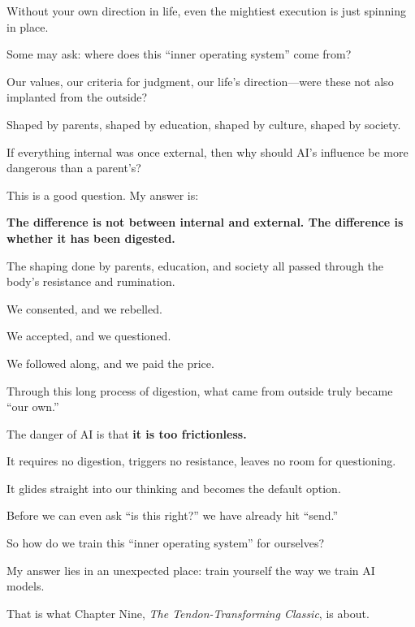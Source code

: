 Without your own direction in life, even the mightiest execution is just spinning in place.

\vspace{1em}

Some may ask: where does this ``inner operating system'' come from?

Our values, our criteria for judgment, our life's direction---were these not also implanted from the outside?

Shaped by parents, shaped by education, shaped by culture, shaped by society.

If everything internal was once external, then why should AI's influence be more dangerous than a parent's?

\vspace{1em}

This is a good question. My answer is:

\textbf{The difference is not between internal and external. The difference is whether it has been digested.}

\vspace{1em}

The shaping done by parents, education, and society all passed through the body's resistance and rumination.

We consented, and we rebelled.

We accepted, and we questioned.

We followed along, and we paid the price.

Through this long process of digestion, what came from outside truly became ``our own.''

\vspace{1em}

The danger of AI is that \textbf{it is too frictionless.}

It requires no digestion, triggers no resistance, leaves no room for questioning.

It glides straight into our thinking and becomes the default option.

Before we can even ask ``is this right?'' we have already hit ``send.''

\vspace{1em}

So how do we train this ``inner operating system'' for ourselves?

My answer lies in an unexpected place: train yourself the way we train AI models.

That is what Chapter Nine, \textit{The Tendon-Transforming Classic}, is about.
